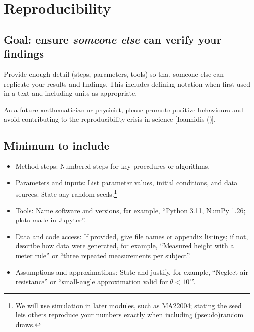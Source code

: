 \documentclass[
  a4paper,
  DIV=11,
  numbers=noendperiod,
  oneside]{scrreprt}
\providecommand{\tightlist}{%
  \setlength{\itemsep}{0pt}\setlength{\parskip}{0pt}}
\begin{document}
\section{Reproducibility}\label{sec-writing-reproducibility}

\subsection{\texorpdfstring{Goal: ensure \emph{someone else} can verify
your
findings}{Goal: ensure someone else can verify your findings}}\label{goal-ensure-someone-else-can-verify-your-findings}

Provide enough detail (steps, parameters, tools) so that someone else
can replicate your results and findings. This includes defining notation
when first used in a text and including units as appropriate.

\begin{tcolorbox}[enhanced jigsaw, colframe=quarto-callout-important-color-frame, title=\textcolor{quarto-callout-important-color}{\faExclamation}\hspace{0.5em}{Reproducibility crisis}, breakable, opacityback=0, titlerule=0mm, colbacktitle=quarto-callout-important-color!10!white, toptitle=1mm, colback=white, coltitle=black, toprule=.15mm, bottomtitle=1mm, left=2mm, arc=.35mm, rightrule=.15mm, bottomrule=.15mm, opacitybacktitle=0.6, leftrule=.75mm]

As a future mathematician or physicist, please promote positive
behaviours and avoid contributing to the reproducibility crisis in
science {[}Ioannidis (){]}.

\end{tcolorbox}

\subsection{Minimum to include}\label{minimum-to-include}

\begin{itemize}
\tightlist
\item
  Method steps: Numbered steps for key procedures or algorithms.
\item
  Parameters and inputs: List parameter values, initial conditions, and
  data sources. State any random seeds.\footnote{We will use simulation
    in later modules, such as MA22004; stating the seed lets others
    reproduce your numbers exactly when including (pseudo)random draws.}
\item
  Tools: Name software and versions, for example, ``Python 3.11, NumPy
  1.26; plots made in Jupyter''.
\item
  Data and code access: If provided, give file names or appendix
  listings; if not, describe how data were generated, for example,
  ``Measured height with a meter rule'' or ``three repeated measurements
  per subject''.
\item
  Assumptions and approximations: State and justify, for example,
  ``Neglect air resistance'' or ``small-angle approximation valid for
  \(\theta<10^\circ\)''.
\end{itemize}
\end{document}
